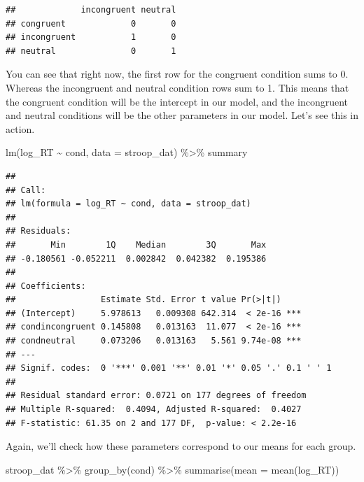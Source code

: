 \documentclass[
]{book}
\newenvironment{Shaded}{\begin{snugshade}}{\end{snugshade}}
\newcommand{\AttributeTok}[1]{\textcolor[rgb]{0.77,0.63,0.00}{#1}}
\newcommand{\FunctionTok}[1]{\textcolor[rgb]{0.00,0.00,0.00}{#1}}
\newcommand{\NormalTok}[1]{#1}
\newcommand{\SpecialCharTok}[1]{\textcolor[rgb]{0.00,0.00,0.00}{#1}}
\begin{document}
\begin{Shaded}
\end{Shaded}

\begin{verbatim}
##             incongruent neutral
## congruent             0       0
## incongruent           1       0
## neutral               0       1
\end{verbatim}

You can see that right now, the first row for the congruent condition sums to 0. Whereas the incongruent and neutral condition rows sum to 1. This means that the congruent condition will be the intercept in our model, and the incongruent and neutral conditions will be the other parameters in our model. Let's see this in action.

\begin{Shaded}
\begin{Highlighting}[]
\FunctionTok{lm}\NormalTok{(log\_RT }\SpecialCharTok{\textasciitilde{}}\NormalTok{ cond, }\AttributeTok{data =}\NormalTok{ stroop\_dat) }\SpecialCharTok{\%\textgreater{}\%}\NormalTok{ summary}
\end{Highlighting}
\end{Shaded}

\begin{verbatim}
## 
## Call:
## lm(formula = log_RT ~ cond, data = stroop_dat)
## 
## Residuals:
##       Min        1Q    Median        3Q       Max 
## -0.180561 -0.052211  0.002842  0.042382  0.195386 
## 
## Coefficients:
##                 Estimate Std. Error t value Pr(>|t|)    
## (Intercept)     5.978613   0.009308 642.314  < 2e-16 ***
## condincongruent 0.145808   0.013163  11.077  < 2e-16 ***
## condneutral     0.073206   0.013163   5.561 9.74e-08 ***
## ---
## Signif. codes:  0 '***' 0.001 '**' 0.01 '*' 0.05 '.' 0.1 ' ' 1
## 
## Residual standard error: 0.0721 on 177 degrees of freedom
## Multiple R-squared:  0.4094, Adjusted R-squared:  0.4027 
## F-statistic: 61.35 on 2 and 177 DF,  p-value: < 2.2e-16
\end{verbatim}

Again, we'll check how these parameters correspond to our means for each group.

\begin{Shaded}
\begin{Highlighting}[]
\NormalTok{stroop\_dat }\SpecialCharTok{\%\textgreater{}\%} \FunctionTok{group\_by}\NormalTok{(cond) }\SpecialCharTok{\%\textgreater{}\%} \FunctionTok{summarise}\NormalTok{(}\AttributeTok{mean =} \FunctionTok{mean}\NormalTok{(log\_RT))}
\end{Highlighting}
\end{Shaded}
\end{document}
